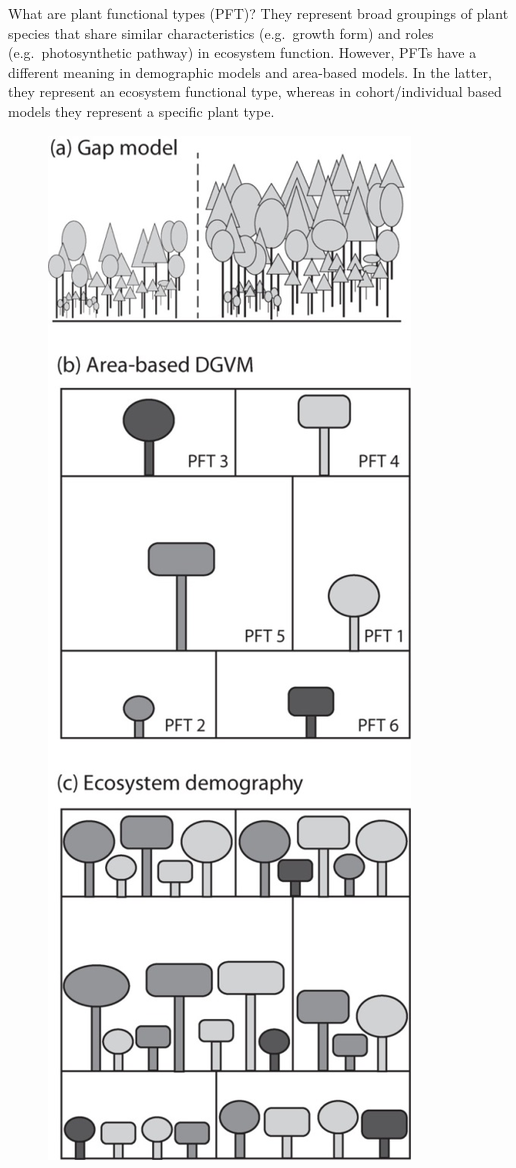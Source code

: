 \documentclass[12pt,oneside]{book}
\begin{document}
What are plant functional types (PFT)? They represent broad groupings of
plant species that share similar characteristics (e.g.~growth form) and
roles (e.g.~photosynthetic pathway) in ecosystem function. However, PFTs
have a different meaning in demographic models and area-based models. In
the latter, they represent an ecosystem functional type, whereas in
cohort/individual based models they represent a specific plant type.

\begin{figure}

{\centering \includegraphics[width=0.8\linewidth]{figures/chap6/f63_3types} 

}
\end{figure}
\end{document}
